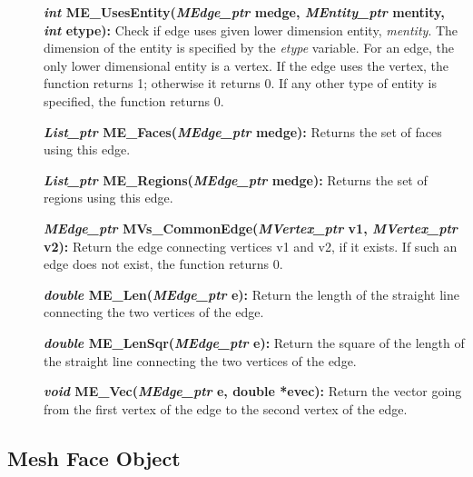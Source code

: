 \documentclass[12pt]{article}
\begin{document}
\begin{description}
\item[]\textbf{\textit{int} ME\_UsesEntity(\textit{MEdge\_ptr} medge,
    \textit{MEntity\_ptr} mentity, \textit{int} etype):} Check if edge
  uses given lower dimension entity, \textit{mentity}. The dimension
  of the entity is specified by the \textit{etype} variable. For an
  edge, the only lower dimensional entity is a vertex. If the edge
  uses the vertex, the function returns 1; otherwise it returns 0. If
  any other type of entity is specified, the function returns 0.

  
\item[]\textbf{\textit{List\_ptr} ME\_Faces(\textit{MEdge\_ptr}
    medge):} Returns the set of faces using this edge.
  
\item[]\textbf{\textit{List\_ptr} ME\_Regions(\textit{MEdge\_ptr}
    medge):} Returns the set of regions using this edge.

\item[]
  
\item[]\textbf{\textit{MEdge\_ptr}
    MVs\_CommonEdge(\textit{MVertex\_ptr} v1, \textit{MVertex\_ptr}
    v2):} Return the edge connecting vertices v1 and v2, if it exists.
  If such an edge does not exist, the function returns 0.
  
\item[]\textbf{\textit{double} ME\_Len(\textit{MEdge\_ptr} e):} Return
  the length of the straight line connecting the two vertices of the
  edge.
  
\item[]\textbf{\textit{double} ME\_LenSqr(\textit{MEdge\_ptr} e):}
  Return the square of the length of the straight line connecting the
  two vertices of the edge.
  
\item[]\textbf{\textit{void} ME\_Vec(\textit{MEdge\_ptr} e, double
    *evec):} Return the vector going from the first vertex of the edge
  to the second vertex of the edge.
\end{description}



\newpage
\subsection{Mesh Face Object}
\end{document}
